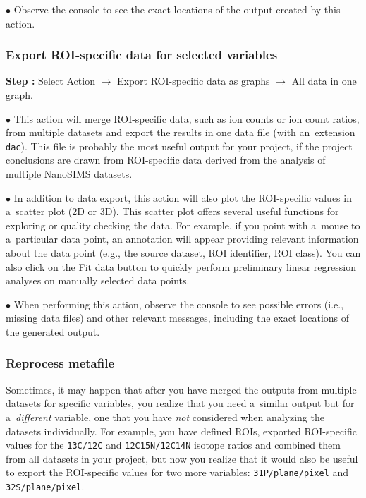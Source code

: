 \documentclass[a4paper, 11pt]{article}
\newcommand{\ttt}[1]{\texttt{#1}}
\newcommand{\lans}[1]{{\color{magenta}#1}}
\newcommand\ra{\rightarrow}
\newcounter{step}
\newcommand\s{\addtocounter{step}{1}\noindent\textbf{Step \thestep:}{ }}
\newcommand\bul{\noindent$\bullet${ }}
\begin{document}
\bul Observe the console to see the exact locations of the output created by this action.

\subsubsection{Export ROI-specific data for selected variables}
\setcounter{step}{0}

\s Select \lans{Action} $\ra$ \lans{Export ROI-specific data as graphs} $\ra$ \lans{All data in one graph}.

\bul This action will merge ROI-specific data, such as ion counts or ion count ratios, from multiple datasets and export the results in one data file (with an~extension \ttt{dac}). This file is probably the most useful output for your project, if the project conclusions are drawn from ROI-specific data derived from the analysis of multiple NanoSIMS datasets.

\bul In addition to data export, this action will also plot the ROI-specific values in a~scatter plot (2D or 3D). This scatter plot offers several useful functions for exploring or quality checking the data. For example, if you point with a~mouse to a~particular data point, an annotation will appear providing relevant information about the data point (e.g., the source dataset, ROI identifier, ROI class). You can also click on the \lans{Fit data} button to quickly perform preliminary linear regression analyses on manually selected data points.

\bul When performing this action, observe the console to see possible errors (i.e., missing data files) and other relevant messages, including the exact locations of the generated output.

\subsubsection{Reprocess metafile}
\setcounter{step}{0}

Sometimes, it may happen that after you have merged the outputs from multiple datasets for specific variables, you realize that you need a~similar output but for a~\emph{different} variable, one that you have \emph{not} considered when analyzing the datasets individually. For example, you have defined ROIs, exported ROI-specific values for the \ttt{13C/12C} and \ttt{12C15N/12C14N} isotope ratios and combined them from all datasets in your project, but now you realize that it would also be useful to export the ROI-specific values for two more variables: \ttt{31P/plane/pixel} and \ttt{32S/plane/pixel}. 
\end{document}
